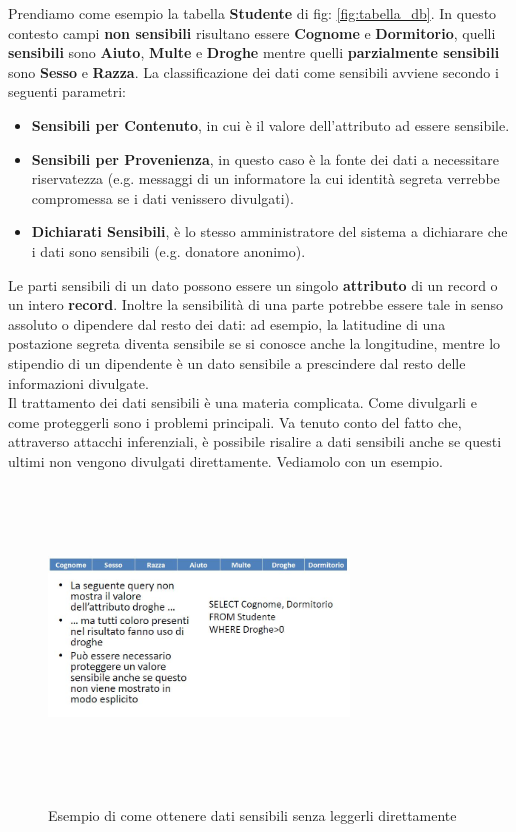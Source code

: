 Prendiamo come esempio la tabella \textbf{Studente} di fig: \ref{fig:tabella_db}. In questo contesto campi \textbf{non sensibili} risultano essere \textbf{Cognome} e \textbf{Dormitorio}, quelli \textbf{sensibili} sono \textbf{Aiuto}, \textbf{Multe} e \textbf{Droghe} mentre quelli \textbf{parzialmente sensibili} sono \textbf{Sesso} e \textbf{Razza}. La classificazione dei dati come sensibili avviene secondo i seguenti parametri:

\begin{itemize}
	\item \textbf{Sensibili per Contenuto}, in cui è il valore dell'attributo ad essere sensibile.
	\item \textbf{Sensibili per Provenienza}, in questo caso è la fonte dei dati a necessitare riservatezza (e.g. messaggi di un informatore la cui identità segreta verrebbe compromessa se i dati venissero divulgati).
	\item \textbf{Dichiarati Sensibili}, è lo stesso amministratore del sistema a dichiarare che i dati sono sensibili (e.g. donatore anonimo).
\end{itemize}

Le parti sensibili di un dato possono essere un singolo \textbf{attributo} di un record o un intero \textbf{record}. Inoltre la sensibilità di una parte potrebbe essere tale in senso assoluto o dipendere dal resto dei dati: ad esempio, la latitudine di una postazione segreta diventa sensibile se si conosce anche la longitudine, mentre lo stipendio di un dipendente è un dato sensibile a prescindere dal resto delle informazioni divulgate. \\

Il trattamento dei dati sensibili è una materia complicata. Come divulgarli e come proteggerli sono i problemi principali. Va tenuto conto del fatto che, attraverso attacchi inferenziali, è possibile risalire a dati sensibili anche se questi ultimi non vengono divulgati direttamente. Vediamolo con un esempio.
\begin{figure}[htbp]
	\centering
		{\includegraphics[height=8cm, width=8cm, keepaspectratio]{Immagini/dati_sensibili/prot_dati_02.JPG}}
			\caption{Esempio di come ottenere dati sensibili senza leggerli direttamente \label{fig:query_db}}
\end{figure}

